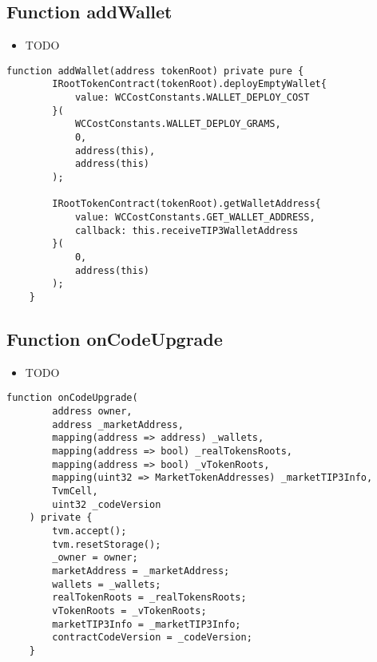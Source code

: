 \subsection{Function addWallet}

\noindent\begin{itemize}
\item TODO
\end{itemize}

\begin{lstlisting}[firstnumber=175]
    function addWallet(address tokenRoot) private pure {
        IRootTokenContract(tokenRoot).deployEmptyWallet{
            value: WCCostConstants.WALLET_DEPLOY_COST
        }(
            WCCostConstants.WALLET_DEPLOY_GRAMS,
            0,
            address(this),
            address(this)
        );

        IRootTokenContract(tokenRoot).getWalletAddress{
            value: WCCostConstants.GET_WALLET_ADDRESS,
            callback: this.receiveTIP3WalletAddress
        }(
            0,
            address(this)
        );
    }
\end{lstlisting}

\subsection{Function onCodeUpgrade}

\noindent\begin{itemize}
\item TODO
\end{itemize}

\begin{lstlisting}[firstnumber=93]
    function onCodeUpgrade(
        address owner, 
        address _marketAddress, 
        mapping(address => address) _wallets, 
        mapping(address => bool) _realTokensRoots, 
        mapping(address => bool) _vTokenRoots, 
        mapping(uint32 => MarketTokenAddresses) _marketTIP3Info, 
        TvmCell, 
        uint32 _codeVersion
    ) private {
        tvm.accept();
        tvm.resetStorage();
        _owner = owner;
        marketAddress = _marketAddress;
        wallets = _wallets;
        realTokenRoots = _realTokensRoots;
        vTokenRoots = _vTokenRoots;
        marketTIP3Info = _marketTIP3Info;
        contractCodeVersion = _codeVersion;
    }
\end{lstlisting}
